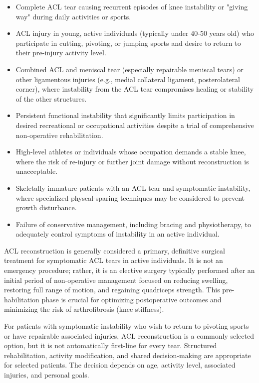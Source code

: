 \begin{itemize}
  \item Complete ACL tear causing recurrent episodes of knee instability or "giving way" during daily activities or sports.
  \item ACL injury in young, active individuals (typically under 40-50 years old) who participate in cutting, pivoting, or jumping sports and desire to return to their pre-injury activity level.
  \item Combined ACL and meniscal tear (especially repairable meniscal tears) or other ligamentous injuries (e.g., medial collateral ligament, posterolateral corner), where instability from the ACL tear compromises healing or stability of the other structures.
  \item Persistent functional instability that significantly limits participation in desired recreational or occupational activities despite a trial of comprehensive non-operative rehabilitation.
  \item High-level athletes or individuals whose occupation demands a stable knee, where the risk of re-injury or further joint damage without reconstruction is unacceptable.
  \item Skeletally immature patients with an ACL tear and symptomatic instability, where specialized physeal-sparing techniques may be considered to prevent growth disturbance.
  \item Failure of conservative management, including bracing and physiotherapy, to adequately control symptoms of instability in an active individual.
\end{itemize}

ACL reconstruction is generally considered a primary, definitive surgical treatment for symptomatic ACL tears in active individuals. It is not an emergency procedure; rather, it is an elective surgery typically performed after an initial period of non-operative management focused on reducing swelling, restoring full range of motion, and regaining quadriceps strength. This pre-habilitation phase is crucial for optimizing postoperative outcomes and minimizing the risk of arthrofibrosis (knee stiffness).

For patients with symptomatic instability who wish to return to pivoting sports or have repairable associated injuries, ACL reconstruction is a commonly selected option, but it is not automatically first-line for every tear. Structured rehabilitation, activity modification, and shared decision-making are appropriate for selected patients. The decision depends on age, activity level, associated injuries, and personal goals.

